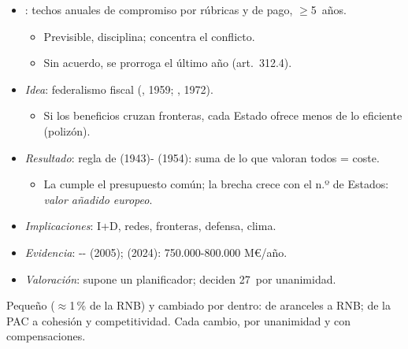 \documentclass{article}
\begin{document}
\begin{columnas}
\begin{itemize}
\item {}: techos anuales de compromiso por rúbricas y de pago, $\geq$5~años.
  \begin{itemize}
  \item Previsible, disciplina; concentra el conflicto.
  \item Sin acuerdo, se prorroga el último año (art.~312.4).
  \end{itemize}
\end{itemize}
\begin{itemize}
\item \emph{Idea}: federalismo fiscal (, 1959; , 1972).
  \begin{itemize}
  \item Si los beneficios cruzan fronteras, cada Estado ofrece menos de lo eficiente (polizón).
  \end{itemize}
\item \emph{Resultado}: regla de  (1943)- (1954): suma de lo que valoran todos = coste.
  \begin{itemize}
  \item La cumple el presupuesto común; la brecha crece con el n.º de Estados: \emph{valor añadido europeo}.
  \end{itemize}
\item \emph{Implicaciones}: I+D, redes, fronteras, defensa, clima.
\item \emph{Evidencia}: -- (2005);  (2024): 750.000-800.000 M€/año.
\item \emph{Valoración}: supone un planificador; deciden 27~por unanimidad.
\end{itemize}

\begin{ideaclave}
Pequeño ($\approx$1\,\% de la RNB) y cambiado por dentro: de aranceles a RNB; de la PAC a cohesión y competitividad. Cada cambio, por unanimidad y con compensaciones.
\end{ideaclave}


\end{columnas}
\end{document}
